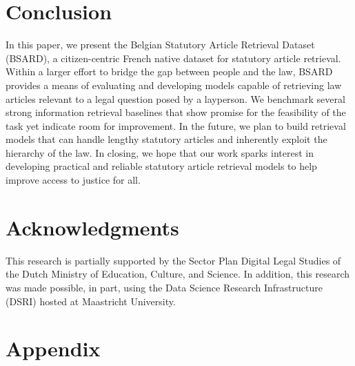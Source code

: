 \documentclass[11pt]{article}
\begin{document}
\section{Conclusion \label{sec:conclusion}}
In this paper, we present the Belgian Statutory Article Retrieval Dataset (BSARD), a citizen-centric French native dataset for statutory article retrieval. Within a larger effort to bridge the gap between people and the law, BSARD provides a means of evaluating and developing models capable of retrieving law articles relevant to a legal question posed by a layperson. We benchmark several strong information retrieval baselines that show promise for the feasibility of the task yet indicate room for improvement. In the future, we plan to build retrieval models that can handle lengthy statutory articles and inherently exploit the hierarchy of the law. In closing, we hope that our work sparks interest in developing practical and reliable statutory article retrieval models to help improve access to justice for all.






\section*{Acknowledgments}
This research is partially supported by the Sector Plan Digital Legal Studies of the Dutch Ministry of Education, Culture, and Science. In addition, this research was made possible, in part, using the Data Science Research Infrastructure (DSRI) hosted at Maastricht University.






\appendix
\section*{Appendix}
\end{document}
